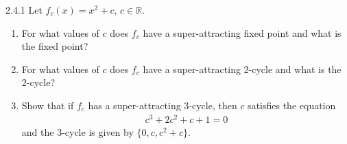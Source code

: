 \begin{problem}{2.4.1}
  Let $f_c(x) = x^2 + c$, $c\in\mathbb{R}$.
  \begin{enumerate}
    \item For what values of $c$ does $f_c$ have a super-attracting fixed point
      and what is the fixed point?
    \item For what values of $c$ does $f_c$ have a super-attracting 2-cycle
      and what is the 2-cycle?
    \item Show that if $f_c$ has a super-attracting 3-cycle, then $c$ satisfies
      the equation
      \begin{align*}
        c^3 + 2c^2 +c +1 = 0
      \end{align*}
      and the 3-cycle is given by $\{0, c, c^2 + c\}$.
  \end{enumerate}
\end{problem}

